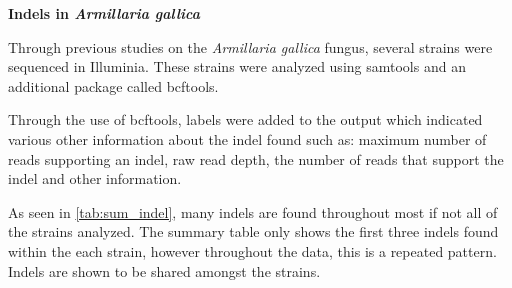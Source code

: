 \documentclass[../main.tex]{subfiles}
\begin{document}
\textbf{Indels in \textit{Armillaria gallica}}

Through previous studies on the \textit{Armillaria gallica} fungus, several strains were sequenced in Illuminia. These strains were analyzed using samtools and an additional package called bcftools. 

Through the use of bcftools, labels were added to the output which indicated various other information about the indel found such as: maximum number of reads supporting an indel, raw read depth, the number of reads that support the indel and other information.

As seen in \ref{tab:sum_indel}, many indels are found throughout most if not all of the strains analyzed. The summary table only shows the first three indels found within the each strain, however throughout the data, this is a repeated pattern. Indels are shown to be shared amongst the strains. 
\end{document}
